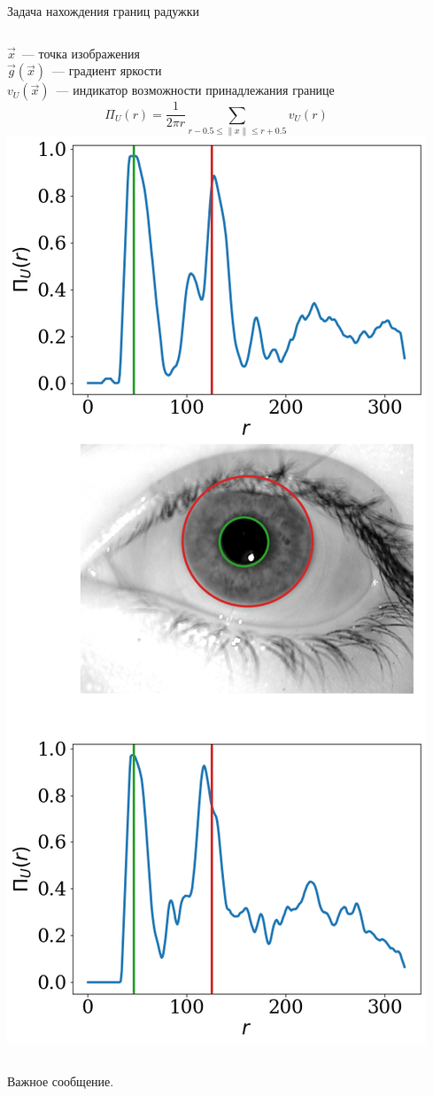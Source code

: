 \documentclass{beamer}
\begin{document}
\begin{frame}{Задача нахождения границ радужки}
\begin{columns}[c]
		$\vec{x}$~--- точка изображения\\ 
		$\vec{g}(\vec{x})$~--- градиент яркости\\
		$v_U(\vec{x})$~--- индикатор возможности принадлежания границе
		\[
		\Pi_U(r) = \frac{1}{2\pi r} \sum_{r-0.5 \leqslant \parallel x \parallel \leqslant r + 0.5} v_U(r)
		\]
    \includegraphics[scale=0.2]{img/eye.png}
\end{columns}

\bigskip
Важное {\color{red}сообщение}.
\end{frame}
\end{document}

